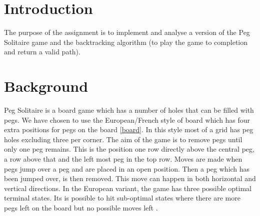 \documentclass[a4paper]{article}
\begin{document}
\begin{titlepage}

 

\vfill %

\end{titlepage}

\clearpage
\setcounter{page}{1}



\section{Introduction}
The purpose of the assignment is to implement and analyse a version of the Peg Solitaire game and the backtracking algorithm (to play the game to completion and return a valid path).

\section{Background}
Peg Solitaire is a board game which has a number of holes that can be filled with pegs. We have chosen to use the European/French style of board which has four extra positions for pegs on the board \ref{board}. In this style most of a grid has peg holes excluding three per corner. The aim of the game is to remove pegs until only one peg remains. This is the position one row directly above the central peg, a row above that and the left most peg in the top row. Moves are made when pegs jump over a peg and are placed in an open position. Then a peg which has been jumped over, is then removed. This move can happen in both horizontal and vertical directions. In the European variant, the game has three possible optimal terminal states. Its is possible to hit sub-optimal states where there are more pegs left on the board but no possible moves left \cite{harder}. 
\end{document}
